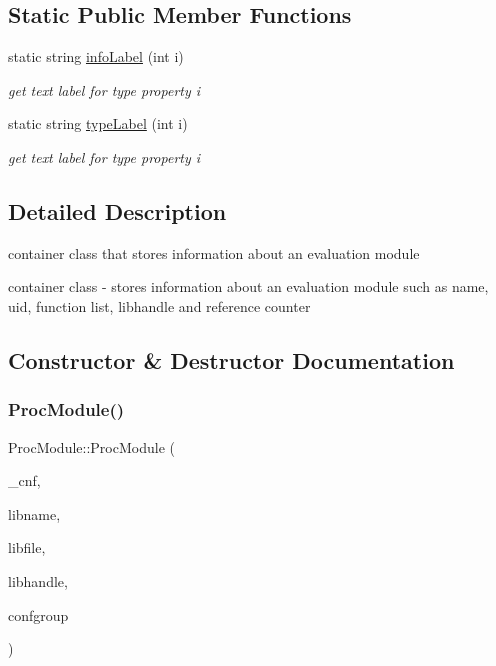 \subsection*{Static Public Member Functions}
\begin{DoxyCompactItemize}
\item 
\mbox{\label{classProcModule_a9403c5e74c333c1885087dc577d07e22}} 
static string \hyperlink{classProcModule_a9403c5e74c333c1885087dc577d07e22}{info\+Label} (int i)
\begin{DoxyCompactList}\small\item\em get text label for type property i \end{DoxyCompactList}\item 
\mbox{\label{classProcModule_a8e1f0c83dbe077e57d3b9990ee3308db}} 
static string \hyperlink{classProcModule_a8e1f0c83dbe077e57d3b9990ee3308db}{type\+Label} (int i)
\begin{DoxyCompactList}\small\item\em get text label for type property i \end{DoxyCompactList}\end{DoxyCompactItemize}


\subsection{Detailed Description}
container class that stores information about an evaluation module 

container class -\/ stores information about an evaluation module such as name, uid, function list, libhandle and reference counter 

\subsection{Constructor \& Destructor Documentation}
\mbox{\label{classProcModule_a3dcb3d64eae9628446986b254073cb4f}} 
\subsubsection{\texorpdfstring{Proc\+Module()}{ProcModule()}}
{\footnotesize\ttfamily Proc\+Module\+::\+Proc\+Module (\begin{DoxyParamCaption}\item[{\hyperlink{classConfigManager}{Config\+Manager} $\ast$}]{\+\_\+cnf,  }\item[{string}]{libname,  }\item[{string}]{libfile,  }\item[{\hyperlink{Module_8h_acbeb44869400b78e5f4097d5c49fc093}{lib\+Handle\+\_\+t}}]{libhandle,  }\item[{string}]{confgroup }\end{DoxyParamCaption})}



